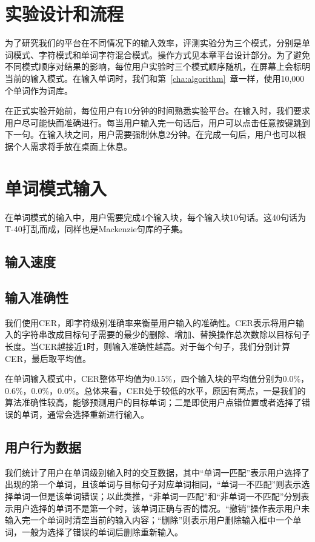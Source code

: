 \section{实验设计和流程}
为了研究我们的平台在不同情况下的输入效率，评测实验分为三个模式，分别是单词模式、字符模式和单词字符混合模式。操作方式见本章平台设计部分。为了避免不同模式顺序对结果的影响，每位用户实验时三个模式顺序随机，在屏幕上会标明当前的输入模式。在输入单词时，我们和第~\ref{cha:algorithm}~章一样，使用10,000个单词作为词库。

在正式实验开始前，每位用户有10分钟的时间熟悉实验平台。在输入时，我们要求用户尽可能快而准确进行。每当用户输入完一句话后，用户可以点击任意按键跳到下一句。在输入块之间，用户需要强制休息2分钟。在完成一句后，用户也可以根据个人需求将手放在桌面上休息。


\section{单词模式输入}
在单词模式的输入中，用户需要完成4个输入块，每个输入块10句话。这40句话为T-40\cite{t40}打乱而成，同样也是Mackenzie句库的子集\cite{mackenzie2003phrase}。

\subsection{输入速度}
\subsection{输入准确性}
我们使用CER\cite{cer}，即字符级别准确率来衡量用户输入的准确性。CER表示将用户输入的字符串改成目标句子需要的最少的删除、增加、替换操作总次数除以目标句子长度。当CER越接近1时，则输入准确性越高。对于每个句子，我们分别计算CER，最后取平均值。

在单词输入模式中，CER整体平均值为0.15\%，四个输入块的平均值分别为0.0\%，0.6\%，0.0\%，0.0\%。总体来看，CER处于较低的水平，原因有两点，一是我们的算法准确性较高，能够预测用户的目标单词；二是即使用户点错位置或者选择了错误的单词，通常会选择重新进行输入。

\subsection{用户行为数据}
我们统计了用户在单词级别输入时的交互数据，其中“单词一匹配”表示用户选择了出现的第一个单词，且该单词与目标句子对应单词相同，“单词一不匹配”则表示选择单词一但是该单词错误；以此类推，“非单词一匹配”和“非单词一不匹配”分别表示用户选择的单词不是第一个时，该单词正确与否的情况。“撤销”操作表示用户未输入完一个单词时清空当前的输入内容；“删除”则表示用户删除输入框中一个单词，一般为选择了错误的单词后删除重新输入。

